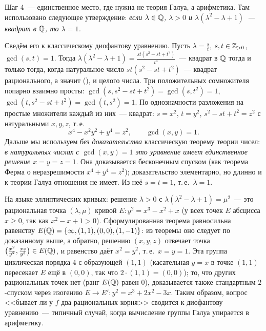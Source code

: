 \begin{aside}
Шаг 4~--- единственное место, где нужна не теория Галуа, а арифметика. Там использовано следующее утверждение:
\emph{если $\lambda\in\mathbb Q$, $\lambda>0$ и $\lambda(\lambda^2-\lambda+1)$~--- квадрат в $\mathbb Q$, то $\lambda=1$.}

Сведём его к классическому диофантову уравнению. Пусть $\lambda=\frac st$, $s,t\in\mathbb Z_{>0}$, $\gcd(s,t)=1$. Тогда
$\lambda(\lambda^2-\lambda+1)=\frac{st(s^2-st+t^2)}{t^4}$~--- квадрат в $\mathbb Q$ тогда и только тогда, когда натуральное число $st(s^2-st+t^2)$~---
квадрат рационального, а значит (), и целого числа. Три положительных сомножителя попарно взаимно просты:
$\gcd(s,s^2-st+t^2)=\gcd(s,t^2)=1$, $\gcd(t,s^2-st+t^2)=\gcd(t,s^2)=1$. По однозначности разложения на простые множители каждый
из них~--- квадрат: $s=x^2$, $t=y^2$, $s^2-st+t^2=z^2$ с натуральными $x,y,z$, т.\,е.
\[
x^4-x^2y^2+y^4=z^2,\qquad \gcd(x,y)=1 .
\]
Дальше мы используем \emph{без доказательства} классическую теорему теории чисел: \emph{в натуральных числах с $\gcd(x,y)=1$
это уравнение имеет единственное решение $x=y=z=1$}. Она доказывается бесконечным спуском (как теорема Ферма о
неразрешимости $x^4+y^4=z^2$); доказательство элементарно, но длинно и к теории Галуа отношения не имеет. Из неё $s=t=1$,
т.\,е.\ $\lambda=1$.

На языке эллиптических кривых: решение $\lambda>0$ с $\lambda(\lambda^2-\lambda+1)=\mu^2$~--- это рациональная точка $(\lambda,\mu)$ кривой
$E\colon y^2=x^3-x^2+x$ (у всех точек $E$ абсцисса $x\ge0$, так как $x^2-x+1>0$). Сформулированная теорема равносильна
равенству $E(\mathbb Q)=\{\infty,(1,1),(0,0),(1,-1)\}$: из теоремы оно следует по доказанному выше, а обратно, решению $(x,y,z)$
отвечает точка $\bigl(\frac{x^2}{y^2},\frac{xz}{y^3}\bigr)\in E(\mathbb Q)$, и равенство даёт $x^2=y^2$, т.\,е.\ $x=y=1$. Эта группа
циклическая порядка $4$ с образующей $(1,1)$ (касательная $y=x$ в точке $(1,1)$ пересекает $E$ ещё в $(0,0)$, так что
$2\cdot(1,1)=(0,0)$); то, что других рациональных точек нет (ранг $E(\mathbb Q)$ равен $0$), доказывается также стандартным $2$-спуском
через изогению $E\to E'\colon y^2=x^3+2x^2-3x$. Таким образом, вопрос <<бывает ли у $f$ два рациональных корня>> сводится к
диофантову уравнению~--- типичный случай, когда вычисление группы Галуа упирается в арифметику.
\end{aside}

